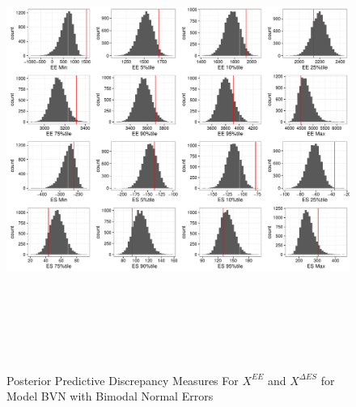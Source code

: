 \documentclass[11pt]{article}\usepackage[]{graphicx}\usepackage[]{color}
\begin{document}
   \begin{figure}
  \centering
  \includegraphics[width=17cm,height=15cm]{manual_figure/wpxdiagbvnb.pdf}
  \caption{Posterior Predictive Discrepancy Measures For $X^{EE}$ and $X^{\Delta ES}$ for Model BVN with Bimodal Normal Errors}
  \label{wpxdiagbvnb}
  \end{figure}
\end{document}
